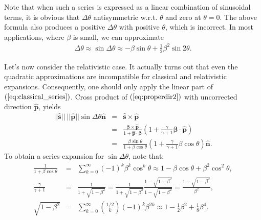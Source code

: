 \documentclass [12pt, a4paper] {article}
\newcommand{\vu}[1]
{
	\mathbf{\hat #1}
}
\newcommand{\vc}[1]
{
	\boldsymbol{#1}
}
\begin{document}
Note that when such a series is expressed as a linear combination 
of sinusoidal terms, it is obvious that $\Delta\theta$ antisymmetric w.r.t. 
$\theta$ and zero at $\theta=0$. The above formula also produces a positive
$\Delta\theta$ with positive $\theta$, which is incorrect.
In most applications, where $\beta$ is small, we can approximate 
\begin {eqnarray}
    \label{eq:classical_series}
    \boxed{
        \quad
        \Delta\theta \approx\sin\Delta\theta \approx 
        -\beta\sin\theta + \frac{1}{2}\beta^2\sin 2\theta.
        \quad
    }
\end {eqnarray}

Let's now consider the relativistic case.
It actually turns out that even the quadratic approximations are incompatible for 
classical and relativistic expansions. Consequently, one should only apply the linear 
part of $(\ref{eq:classical_series})$.
Cross product of $(\ref{eq:properdir2})$ with uncorrected direction $\vu p$, 
yields
\begin {eqnarray}
    ||\vu s||\:||\vu p||\sin\Delta\theta \vu n
    &=&
    \vu s\times\vu p 
    \\
    &=&
    \frac{\vc \beta\times\vu p}{1 + \vu p\cdot\vc\beta}
    \left(
        1 + \frac{\gamma}{\gamma + 1} \vc\beta\cdot\vu p
    \right)
    \\
    &=&
    \frac{\beta\sin\theta}{1 + \beta\cos\theta}
    \left(
        1 + \frac{\gamma}{\gamma + 1}\beta\cos\theta
    \right)
    \vu n.
\end {eqnarray}
To obtain a series expansion for $\sin\Delta\theta$, note that:
\begin {eqnarray}
    \frac{1}{1 + \beta\cos\theta}
    &=& 
    \sum_{k=0}^\infty(-1)^k \beta^k \cos^k\theta
    \approx 
    1 - \beta\cos\theta + \beta^2\cos^2\theta,
    \\
    \frac{\gamma}{\gamma + 1}
    &=&
    \frac{1}{1 + \sqrt{1 - \beta^2}}
    =
    \frac{1}{1 + \sqrt{1 - \beta^2}}
    \frac{1 - \sqrt{1 - \beta^2}}{1 - \sqrt{1 - \beta^2}}
    =
    \frac{1 - \sqrt{1 - \beta^2}}{\beta^2},
    \\
    \sqrt{1 - \beta^2} 
    &=&
    \sum_{k=0}^{\infty}
    \binom{1/2}{k}(-1)^k \beta^{2k}
    \approx 
    1 - \frac{1}{2}\beta^2 + \frac{1}{8}\beta^4.
\end {eqnarray}
\end{document}
